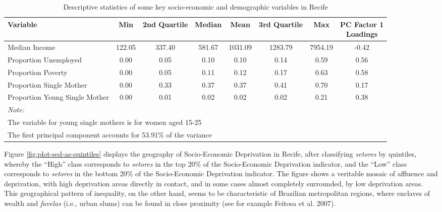 \documentclass[smallextended]{svjour3}       %
\begin{document}
\begin{table}

\caption{\label{tab:table-sed-descriptive-statistics}\label{tab:sed-descriptive-statistics}Descriptive statistics of some key socio-economic and demographic variables in Recife}
\centering
\begin{tabular}[t]{lccccccc}
\toprule
Variable & Min & 2nd Quartile & Median & Mean & 3rd Quartile & Max & \makecell[l]{PC Factor 1\\ Loadings}\\
\midrule
Median Income & 122.05 & 337.40 & 581.67 & 1031.09 & 1283.79 & 7954.19 & -0.42\\
Proportion Unemployed & 0.00 & 0.05 & 0.10 & 0.10 & 0.14 & 0.59 & 0.56\\
Proportion Poverty & 0.00 & 0.05 & 0.11 & 0.12 & 0.17 & 0.63 & 0.58\\
Proportion Single Mother & 0.00 & 0.33 & 0.37 & 0.37 & 0.41 & 0.70 & 0.17\\
Proportion Young Single Mother & 0.00 & 0.01 & 0.02 & 0.02 & 0.02 & 0.21 & 0.38\\
\bottomrule
\multicolumn{8}{l}{\textit{Note: }}\\
\multicolumn{8}{l}{The variable for young single mothers is for women aged 15-25}\\
\multicolumn{8}{l}{The first principal component accounts for 53.91\% of the variance}\\
\end{tabular}
\end{table}

Figure \ref{fig:plot-sed-as-quintiles} displays the geography of
Socio-Economic Deprivation in Recife, after classifying \emph{setores}
by quintiles, whereby the ``High'' class corresponds to \emph{setores}
in the top 20\% of the Socio-Economic Deprivation indicator, and the
``Low'' class corresponds to \emph{setores} in the bottom 20\% of the
Socio-Economic Deprivation indicator. The figure shows a veritable
mosaic of affluence and deprivation, with high deprivation areas
directly in contact, and in some cases almost completely surrounded, by
low deprivation areas. This geographical pattern of inequality, on the
other hand, seems to be characteristic of Brazilian metropolitan
regions, where enclaves of wealth and \emph{favelas} (i.e., urban slums)
can be found in close proximity (see for example Feitosa et al. 2007).
\end{document}
